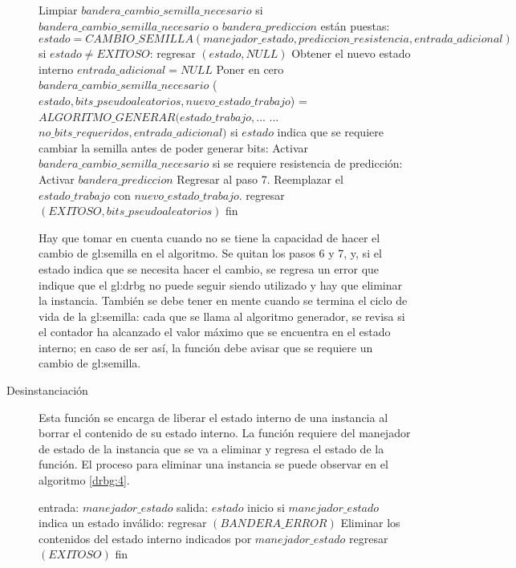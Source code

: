 \begin{description}
\begin{pseudocodigo}[caption={DRBG, generación.}, label={drbg:3}]
        Limpiar $bandera\_cambio\_semilla\_necesario$
        si $bandera\_cambio\_semilla\_necesario$ o $bandera\_prediccion$ están puestas:
          $estado = CAMBIO\_SEMILLA(manejador\_estado, prediccion\_resistencia, entrada\_adicional)$
          si $estado \neq EXITOSO$:
            regresar $(estado, NULL)$
          Obtener el nuevo estado interno
          $entrada\_adicional = NULL$
          Poner en cero $bandera\_cambio\_semilla\_necesario$ 
        ($estado, bits\_pseudoaleatorios, nuevo\_estado\_trabajo$) = $ALGORITMO\_GENERAR(estado\_trabajo,$...
          ...$no\_bits\_requeridos, entrada\_adicional)$
        si $estado$ indica que se requiere cambiar la semilla antes de poder generar bits:
          Activar $bandera\_cambio\_semilla\_necesario$
          si se requiere resistencia de predicción:
            Activar $bandera\_prediccion$
          Regresar al paso 7.
        Reemplazar el $estado\_trabajo$ con $nuevo\_estado\_trabajo$.
        regresar $(EXITOSO, bits\_pseudoaleatorios)$
      fin
    \end{pseudocodigo}
    Hay que tomar en cuenta cuando no se tiene la capacidad de hacer el cambio
    de \gls{gl:semilla} en el algoritmo. Se quitan los pasos 6 y 7, y, si el
    estado indica que se necesita hacer el cambio, se regresa un error que
    indique que el \gls{gl:drbg} no puede seguir siendo utilizado y hay que
    eliminar la instancia. También se debe tener en mente cuando se termina
    el ciclo de vida de la \gls{gl:semilla}: cada que se llama al algoritmo
    generador, se revisa si el contador ha alcanzado el valor máximo que se
    encuentra en el estado interno; en caso de ser así, la función debe avisar
    que se requiere un cambio de \gls{gl:semilla}.

  \item [Desinstanciación] Esta función se encarga de liberar el estado interno
    de una instancia al borrar el contenido de su estado interno. La función
    requiere del manejador de estado de la instancia que se va a eliminar y
    regresa el estado de la función. El proceso para eliminar una instancia se
    puede observar en el algoritmo \ref{drbg:4}.

    \begin{pseudocodigo}[caption={DRBG, desinstanciación.}, label={drbg:4}]
      entrada:  $manejador\_estado$
      salida:   $estado$
      inicio
        si $manejador\_estado$ indica un estado inválido:
          regresar $(BANDERA\_ERROR)$
        Eliminar los contenidos del estado interno indicados por $manejador\_estado$
        regresar $(EXITOSO)$
      fin
    \end{pseudocodigo}

\end{description}
